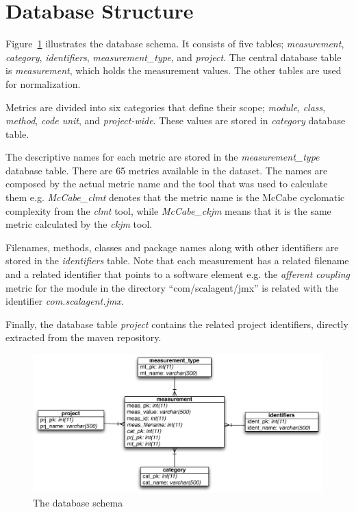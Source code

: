 \documentclass{sig-alternate}
\begin{document}
\section{Database Structure}
\label{sec:db}

Figure~\ref{fig:database-schema} illustrates the database schema. It consists of five tables; \textit{measurement}, \textit{category}, \textit{identifiers}, \textit{measurement\_type}, and \textit{project}. The central database table is \textit{measurement}, which holds the measurement values. The other tables are used for normalization.

Metrics are divided into six categories that define their scope; \textit{module}, \textit{class}, \textit{method}, \textit{code unit}, and \textit{project-wide}. These values are stored in \textit{category} database table.

The descriptive names for each metric are stored in the \textit{measurement\_type} database table. There are 65 metrics available in the dataset. The names are composed by the actual metric name and the tool that was used to calculate them e.g. \textit{McCabe\_clmt} denotes that the metric name is the McCabe cyclomatic complexity from the \textit{clmt} tool, while \textit{McCabe\_ckjm} means that it is the same metric calculated by the \textit{ckjm} tool.

Filenames, methods, classes and package names along with other identifiers are stored in the \textit{identifiers} table. Note that each measurement has a related filename and a related identifier that points to a software element e.g. the \textit{afferent coupling} metric for the module in the directory ``com/scalagent/jmx'' is related with the identifier \textit{com.scalagent.jmx}.

Finally, the database table \textit{project} contains the related project identifiers, directly extracted from the maven repository.

\begin{figure}
\centering
\includegraphics[scale=0.5]{database-schema}
\caption{The database schema}
\label{fig:database-schema}
\end{figure}
\end{document}
